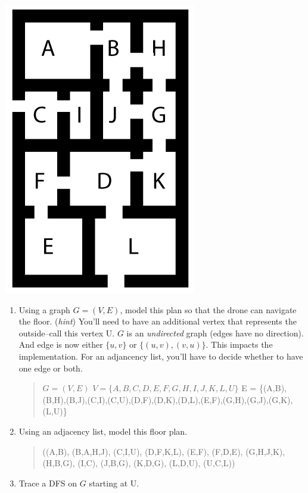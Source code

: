 \documentclass{article}
\begin{document}
\begin{enumerate}
\begin{center}
\includegraphics[scale=0.40]{maze55}
\end{center}
\begin{enumerate}
\item Using a graph $ G = (V,E)$, model this plan so that the drone can navigate the floor.  ({\it hint}) You'll need to have an additional vertex that represents the outside--call this vertex \textsf{U}.  $G$ is  an {\it undirected} graph (edges have no direction).  And edge is now either $\{u,v\}$ or $\{(u,v), (v,u)\}$.  This impacts the implementation.    For an adjancency list, you'll have to decide whether to have one edge or both. 
\begin{quote}
$G = (V,E)$\newline
$V = \{A,B,C,D,E,F,G,H,I,J,K,L,U\}$\newline
E = \{(A,B),(B,H),(B,J),(C,I),(C,U),(D,F),(D,K),(D,L),(E,F),(G,H),(G,J),(G,K),(L,U)\}
\end{quote}
\newpage
\item Using an adjacency list, model this floor plan.
\begin{quote}
((A,B), (B,A,H,J), (C,I,U), (D,F,K,L), (E,F), (F,D,E), (G,H,J,K), (H,B,G), (I,C), (J,B,G), (K,D,G), (L,D,U), (U,C,L))
\end{quote}
\item Trace a DFS on $G$ starting at \textsf{U}.
\begin{quote}

\end{quote}
\end{enumerate}
\end{enumerate}
\end{document}
